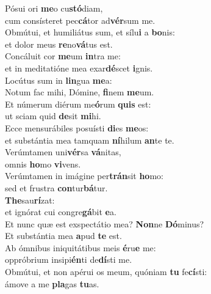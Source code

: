 \evenverse Pósui ori \textbf{me}o cu\textbf{stó}diam,~\*\\
\evenverse cum consísteret pec\textbf{cá}tor ad\textbf{vér}sum me.\\
\oddverse Obmútui, et humiliátus sum, et sílu\textbf{i} a \textbf{bo}nis:~\*\\
\oddverse et dolor meus \textbf{re}no\textbf{vá}tus est.\\
\evenverse Concáluit cor \textbf{me}um \textbf{in}tra me:~\*\\
\evenverse et in meditatióne mea exar\textbf{dé}scet \textbf{i}gnis.\\
\oddverse Locútus sum in \textbf{lin}gua \textbf{me}a:~\*\\
\oddverse Notum fac mihi, Dómine, \textbf{fi}nem \textbf{me}um.\\
\evenverse Et númerum diérum me\textbf{ó}rum \textbf{quis} est:~\*\\
\evenverse ut sciam quid \textbf{de}sit \textbf{mi}hi.\\
\oddverse Ecce mensurábiles posuísti \textbf{di}es \textbf{me}os:~\*\\
\oddverse et substántia mea tamquam \textbf{ní}hilum \textbf{an}te te.\\
\evenverse Verúmtamen uni\textbf{vér}sa \textbf{vá}nitas,~\*\\
\evenverse omnis \textbf{ho}mo \textbf{vi}vens.\\
\oddverse Verúmtamen in imágine per\textbf{trán}sit \textbf{ho}mo:~\*\\
\oddverse sed et frustra \textbf{con}tur\textbf{bá}tur.\\
\evenverse \textbf{The}sau\textbf{rí}zat:~\*\\
\evenverse et ignórat cui congre\textbf{gá}bit \textbf{e}a.\\
\oddverse Et nunc quæ est exspectátio mea? \textbf{Non}ne \textbf{Dó}minus?~\*\\
\oddverse Et substántia mea \textbf{a}pud \textbf{te} est.\\
\evenverse Ab ómnibus iniquitátibus meis \textbf{é}ru\textbf{e} me:~\*\\
\evenverse oppróbrium insipi\textbf{én}ti de\textbf{dí}sti me.\\
\oddverse Obmútui, et non apérui os meum, quóniam \textbf{tu} fe\textbf{cí}sti:~\*\\
\oddverse ámove a me \textbf{pla}gas \textbf{tu}as.\\
